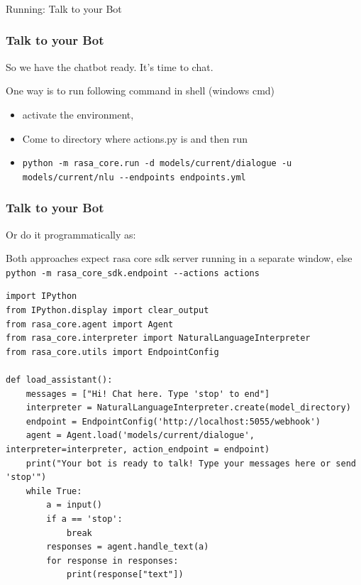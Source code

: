 \begin{frame}[fragile]\frametitle{}
\begin{center}
{\Large Running: Talk to your Bot}

\end{center}
\end{frame}



 \begin{frame}[fragile]\frametitle{Talk to your Bot}

So we have the chatbot ready. It's time to chat.

One way is to run following command in shell (windows cmd) 
\begin{itemize}
\item activate the environment,
\item Come to directory where actions.py is and then run
\item \lstinline|python -m rasa_core.run -d models/current/dialogue -u models/current/nlu --endpoints endpoints.yml|
\end{itemize}

\end{frame}

 \begin{frame}[fragile]\frametitle{Talk to your Bot}

Or do it programmatically as:

Both approaches expect rasa core sdk server running in a separate window, else 
\lstinline|python -m rasa_core_sdk.endpoint --actions actions|


\begin{lstlisting}
import IPython
from IPython.display import clear_output
from rasa_core.agent import Agent
from rasa_core.interpreter import NaturalLanguageInterpreter
from rasa_core.utils import EndpointConfig

def load_assistant():
    messages = ["Hi! Chat here. Type 'stop' to end"]
    interpreter = NaturalLanguageInterpreter.create(model_directory)
    endpoint = EndpointConfig('http://localhost:5055/webhook')
    agent = Agent.load('models/current/dialogue', interpreter=interpreter, action_endpoint = endpoint)
    print("Your bot is ready to talk! Type your messages here or send 'stop'")
    while True:
        a = input()
        if a == 'stop':
            break
        responses = agent.handle_text(a)
        for response in responses:
            print(response["text"])
\end{lstlisting}

\end{frame}

